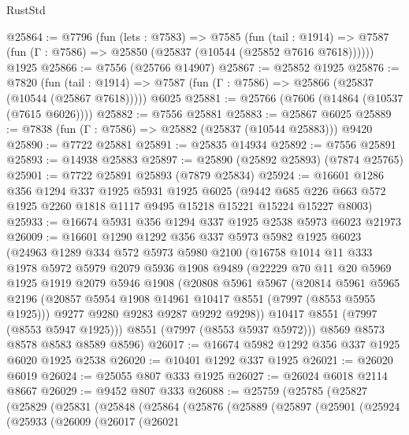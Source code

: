 \begin{lexlean}{RustStd}
\begin{coremodule}
@25864 := @7796
    (fun (lets : @7583) =>
    @7585
      (fun (tail : @1914) =>
      @7587 (fun (Γ : @7586) => @25850 (@25837 (@10544 (@25852 @7616 @7618))))))
    @1925
@25866 := @7556 (@25766 @14907)
@25867 := @25852 @1925
@25876 := @7820
    (fun (tail : @1914) => @7587 (fun (Γ : @7586) => @25866 (@25837 (@10544 (@25867 @7618)))))
    @6025
@25881 := @25766 (@7606 (@14864 (@10537 (@7615 @6026))))
@25882 := @7556 @25881
@25883 := @25867 @6025
@25889 := @7838 (fun (Γ : @7586) => @25882 (@25837 (@10544 @25883))) @9420
@25890 := @7722 @25881
@25891 := @25835 @14934
@25892 := @7556 @25891
@25893 := @14938 @25883
@25897 := @25890 (@25892 @25893) (@7874 @25765)
@25901 := @7722 @25891 @25893 (@7879 @25834)
@25924 := @16601
    @1286
    @356
    @1294
    @337
    @1925
    @5931
    @1925
    @6025
    (@9442 @685 @226 @663 @572 @1925 @2260 @1818 @1117 @9495 @15218 @15221 @15224 @15227 @8003)
@25933 := @16674 @5931 @356 @1294 @337 @1925 @2538 @5973 @6023 @21973
@26009 := @16601
    @1290
    @1292
    @356
    @337
    @5973
    @5982
    @1925
    @6023
    (@24963
      @1289
      @334
      @572
      @5973
      @5980
      @2100
      (@16758
        @1014
        @11
        @333
        @1978
        @5972
        @5979
        @2079
        @5936
        @1908
        @9489
        (@22229
          @70
          @11
          @20
          @5969
          @1925
          @1919
          @2079
          @5946
          @1908
          (@20808
            @5961
            @5967
            (@20814
              @5961
              @5965
              @2196
              (@20857 @5954 @1908 @14961 @10417 @8551 (@7997 (@8553 @5955 @1925)))
              @9277
              @9280
              @9283
              @9287
              @9292
              @9298))
          @10417
          @8551
          (@7997 (@8553 @5947 @1925)))
        @8551
        (@7997 (@8553 @5937 @5972)))
      @8569
      @8573
      @8578
      @8583
      @8589
      @8596)
@26017 := @16674 @5982 @1292 @356 @337 @1925 @6020 @1925 @2538
@26020 := @10401 @1292 @337 @1925
@26021 := @26020 @6019
@26024 := @25055 @807 @333 @1925
@26027 := @26024 @6018 @2114 @8667
@26029 := @9452 @807 @333
@26088 := @25759
    (@25785
      (@25827
        (@25829
          (@25831
            (@25848
              (@25864
                (@25876
                  (@25889
                    (@25897
                      (@25901
                        (@25924
                          (@25933
                            (@26009
                              (@26017
                                (@26021

\end{coremodule}
\end{lexlean}
